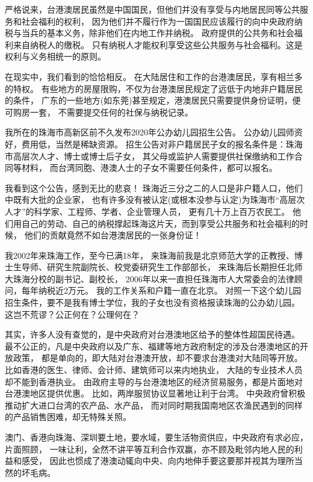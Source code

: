 \documentclass[UTF8, 11pt, oneside]{ctexart}
\begin{document}
严格说来，台港澳居民虽然是中国国民，但他们并没有享受与内地居民同等公共服务和社会福利的权利，
因为他们并不履行作为一国国民应该履行的向中央政府纳税与当兵的基本义务，除非他们在内地工作并纳税。
政府提供的公共务和社会福利来自纳税人的缴税。
只有纳税人才能权利享受这些公共服务与社会福利。这是权利与义务相统一的原则。

在现实中，我们看到的恰恰相反。
在大陆居住和工作的台港澳居民，享有相兰多的特权。
有些地方的房屋限购，不仅为台港澳居民规定了远低于内地非户籍居民的条件，
广东的一些地方(如东莞)甚至规定，港澳居民只需要提供身份证明，便可购房一套，
不需要提交任何的社保与纳税记录。

我所在的珠海市高新区前不久发布2020年公办幼儿园招生公告。
公办幼儿园师资好，费用低，当然是稀缺资源。
招生公告对非户籍居民子女的报名条件是：珠海市高层次人才、博士或博士后子女，
其父母或监护人需要提供社保缴纳和工作合同等材料，
而台湾同胞、港澳人士的子女不需要任何条件，都可以报名。

我看到这个公告，感到无比的悲哀！
珠海近三分之二的人口是非户籍人口，他们中既有大批的企业家，
也有许多没有被认定(或根本没参与认定)为珠海市“高层次人才”的科学家、工程师、学者、企业管理人员，
更有几十万上百万农民工。
他们用自己的劳动、自己的纳税撑起珠海这片天，而到享受公共服务和社会福利的时候，
他们的贡献竟然不如台港澳居民的一张身份证！

我2002年来珠海工作，至今已满18年，
来珠海前我是北京师范大学的正教授、博士生导师、研究生院副院长、校党委研究生工作部部长，
来珠海后长期担任北师大珠海分校的副书记、副校长，
2006年以来一直担任珠海市人大常委会的法律顾问，每年纳税近2万元。
我的工作关系和户籍一直在北京。
对照一下这个幼儿园招生条件，要不是我有博士学位，我的子女也没有资格报读珠海的公办幼儿园。
这岂不荒谬？公正何在？公理何在？

其实，许多人没有查觉的，是中央政府对台港澳地区给予的整体性超国民待遇。
最不公正的，凡是中央政府以及广东、福建等地方政府制定的涉及台港澳地区的开放政策，
都是单向的，即大陆对台港澳开放，却不要求台港澳对大陆同等开放。
比如香港的医生、律师、会计师、建筑师可以来内地执业，
大陆的专业技术人员却不能到香港执业。
由政府主导的与台港澳地区的经济贸易服务，都是片面地对台港澳地区提供优惠。
比如，两岸服贸协议显著地让利于台湾。
中央政府曾积极推动扩大进口台湾的农产品、水产品，
而对同时期我国南地区农渔民遇到的同样的产品销售困难，却无特殊关照。

澳门、香港向珠海、深圳要土地，要水域，要生活物资供应，中央政府有求必应，片面照顾，
一味让利，全然不讲平等互利合作双赢，亦不顾及毗邻内地人民的利益和感受，
因此也惯成了港澳动辄向中央、向内地伸手要这要那并视其为理所当然的坏毛病。
\end{document}
